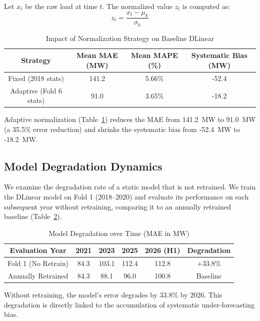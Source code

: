 \documentclass[journal]{IEEEtran}
\begin{document}
Let $x_t$ be the raw load at time $t$. The normalized value $z_t$ is computed as:
\begin{equation}
z_t = \frac{x_t - \mu_k}{\sigma_k}
\end{equation}

\begin{table}[htbp]
\caption{Impact of Normalization Strategy on Baseline DLinear}
\label{tab:norm_impact}
\centering
\begin{tabular}{cccc}
\toprule
\textbf{Strategy} & \textbf{Mean MAE (MW)} & \textbf{Mean MAPE (\%)} & \textbf{Systematic Bias (MW)} \\
\midrule
Fixed (2018 stats) & 141.2 & 5.66\% & -52.4 \\
Adaptive (Fold 6 stats) & 91.0 & 3.65\% & -18.2 \\
\bottomrule
\end{tabular}
\end{table}

Adaptive normalization (Table~\ref{tab:norm_impact}) reduces the MAE from 141.2~MW to 91.0~MW (a 35.5\% error reduction) and shrinks the systematic bias from -52.4~MW to -18.2~MW.

\subsection{Model Degradation Dynamics}
We examine the degradation rate of a static model that is not retrained. We train the DLinear model on Fold 1 (2018--2020) and evaluate its performance on each subsequent year without retraining, comparing it to an annually retrained baseline (Table~\ref{tab:degradation}).

\begin{table}[htbp]
\caption{Model Degradation over Time (MAE in MW)}
\label{tab:degradation}
\centering
\begin{tabular}{cccccc}
\toprule
\textbf{Evaluation Year} & \textbf{2021} & \textbf{2023} & \textbf{2025} & \textbf{2026 (H1)} & \textbf{Degradation} \\
\midrule
Fold 1 (No Retrain) & 84.3 & 103.1 & 112.4 & 112.8 & +33.8\% \\
Annually Retrained & 84.3 & 88.1 & 96.0 & 100.8 & Baseline \\
\bottomrule
\end{tabular}
\end{table}

Without retraining, the model's error degrades by 33.8\% by 2026. This degradation is directly linked to the accumulation of systematic under-forecasting bias.
\end{document}
